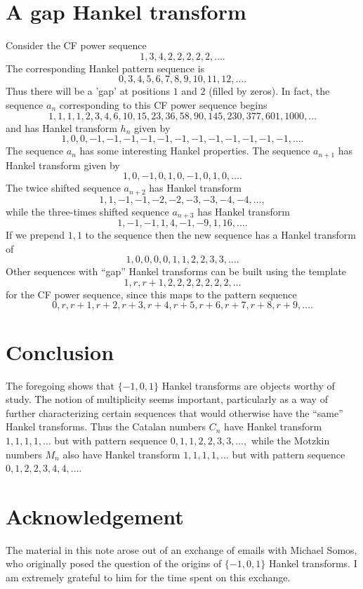 \documentclass[12pt,reqno]{article}
\theoremstyle{definition}
\begin{document}
\section{A gap Hankel transform}
Consider the CF power sequence
$$1,3,4,2,2,2,2,2,\ldots.$$
The corresponding Hankel pattern sequence is
$$0, 3, 4, 5, 6, 7, 8, 9, 10, 11, 12,\ldots.$$
Thus there will be a 'gap' at positions $1$ and $2$ (filled by zeros). In fact, the sequence $a_n$ corresponding to this CF power sequence begins
$$1, 1, 1, 1, 2, 3, 4, 6, 10, 15, 23, 36, 58, 90, 145, 230, 377, 601, 1000,\ldots$$
and has Hankel transform $h_n$ given by
$$1,0,0,-1,-1,-1,-1,-1,-1,-1,-1,-1,-1,-1,-1,\ldots.$$
\noindent The sequence $a_n$ has some interesting Hankel properties. The sequence $a_{n+1}$ has Hankel transform given by
$$1,0,-1,0,1,0,-1,0,1,0,\ldots.$$ \noindent The twice shifted sequence $a_{n+2}$ has Hankel transform
$$1, 1, -1, -1, -2, -2, -3, -3, -4, -4, \ldots,$$ while the three-times shifted sequence $a_{n+3}$ has Hankel transform
$$1, -1, -1, 1, 4, -1, -9, 1, 16, \ldots.$$ If we prepend $1,1$ to the sequence then the new sequence has a Hankel transform
of
$$1,0,0,0,0,1,1,2,2,3,3,\ldots.$$
Other sequences with ``gap'' Hankel transforms can be built using the template
$$1,r,r+1,2,2,2,2,2,2,2,\ldots$$ for the CF power sequence, since this maps to the pattern sequence
$$0, r, r + 1, r + 2, r + 3, r + 4, r + 5, r + 6, r + 7, r + 8, r + 9,\ldots.$$

\section{Conclusion} The foregoing shows that $\{-1,0,1\}$ Hankel transforms are objects worthy of study. The notion of multiplicity seems important, particularly as a way of further characterizing certain sequences that would otherwise have the ``same'' Hankel transforms. Thus the Catalan numbers $C_n$ have Hankel transform $1,1,1,1,\ldots$ but with pattern sequence $0,1,1,2,2,3,3,\ldots,$ while the Motzkin numbers $M_n$ also have Hankel transform $1,1,1,1,\ldots$ but with pattern sequence $0,1,2,2,3,4,4,\ldots$.

\section{Acknowledgement} The material in this note arose out of an exchange of emails with Michael Somos, who originally posed the question of the origins of $\{-1,0,1\}$ Hankel transforms. I am extremely grateful to him for the time spent on this exchange. 
\end{document}
